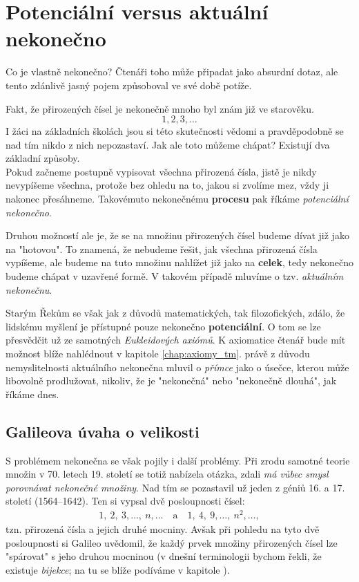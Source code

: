 \section{Potenciální versus aktuální nekonečno}\label{sec:pot_vs_akt_nekonecno}

Co je vlastně nekonečno? Čtenáři toho může připadat jako absurdní dotaz, ale tento zdánlivě jasný pojem způsoboval ve své době potíže.\par
Fakt, že přirozených čísel je nekonečně mnoho byl znám již ve starověku.
\begin{equation*}
1,2,3,\dots
\end{equation*}
I žáci na základních školách jsou si této skutečnosti vědomi a pravděpodobně se nad tím nikdo z nich nepozastaví. Jak ale toto můžeme chápat? Existují dva základní způsoby.\\
Pokud začneme postupně vypisovat všechna přirozená čísla, jistě je nikdy nevypíšeme všechna, protože bez ohledu na to, jakou si zvolíme mez, vždy ji nakonec přesáhneme. Takovémuto nekonečnému \textbf{procesu} pak říkáme \emph{potenciální nekonečno}.\par
Druhou možností ale je, že se na množinu přirozených čísel budeme dívat již jako na "hotovou". To znamená, že nebudeme řešit, jak všechna přirozená čísla vypíšeme, ale budeme na tuto množinu nahlížet již jako na \textbf{celek}, tedy nekonečno budeme chápat v uzavřené formě. V takovém případě mluvíme o tzv. \emph{aktuálním nekonečnu}.
\medskip

Starým Řekům se však jak z důvodů matematických, tak filozofických, zdálo, že lidskému myšlení je přístupné pouze nekonečno \textbf{potenciální}. O tom se lze přesvědčit už ze samotných \emph{Eukleidových axiómů}. K axiomatice čtenář bude mít možnost blíže nahlédnout v kapitole \ref{chap:axiomy_tm}.  právě z důvodu nemyslitelnosti aktuálního nekonečna mluvil o \emph{přímce} jako o úsečce, kterou může libovolně prodlužovat, nikoliv, že je "nekonečná" nebo "nekonečně dlouhá", jak říkáme dnes.

\subsection{Galileova úvaha o velikosti}
\label{subsec:galileo}

S problémem nekonečna se však pojily i další problémy. Při zrodu samotné teorie množin v 70. letech 19. století se totiž nabízela otázka, zdali \emph{má vůbec smysl porovnávat nekonečné množiny}. Nad tím se pozastavil už jeden z géniů 16. a 17. století  (1564--1642). Ten si vypsal dvě posloupnosti čísel:
\begin{align*}
1,\ 2,\ 3,\dots,\ n,\dots \quad \text{a} \quad 1,\ 4,\ 9,\dots,\ n^2,\dots ,
\end{align*}
tzn. přirozená čísla a jejich druhé mocniny. Avšak při pohledu na tyto dvě posloupnosti si Galileo uvědomil, že každý prvek množiny přirozených čísel lze "spárovat" s jeho druhou mocninou (v dnešní terminologii bychom řekli, že existuje \emph{bijekce}; na tu se blíže podíváme v kapitole ).


